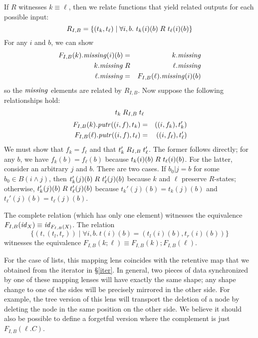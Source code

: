 \begin{defn}[$R$-similarity]
\begin{theorem}
\begin{lemma}
\begin{theorem}[No products]
\begin{lemma}
\begin{defn}
\begin{theorem}
\begin{corollary}[Hylomorphism]
\begin{defn}
\begin{lenseqv}
If $R$ witnesses $k \equiv \ell$, then we relate functions that yield
related outputs for each possible input:
\[R_{I,B} = \{(t_k,t_\ell) \mid \forall i,b.\ t_k(i)(b) \mathrel{R_{}} t_\ell(i)(b)\}\]
For any $i$ and $b$, we can show
\begin{eqnarray*}
F_{I,B}(k).\mathit{missing}(i)(b) &=& k.\mathit{missing} \\
k.\mathit{missing} &\mathrel{R_{}}& \ell.\mathit{missing} \\
\ell.\mathit{missing} &=& F_{I,B}(\ell).\mathit{missing}(i)(b)
\end{eqnarray*}
so the $\mathit{missing}$ elements are related by $R_{I,B}$. Now suppose the
following relationships hold:
\[t_k \mathrel{R_{I,B}} t_\ell\]
\vspace{-4ex} %
\begin{eqnarray*}
    F_{I,B}(k).\mathit{putr}((i,f),t_k) &=& ((i,f_k),t_k') \\
    F_{I,B}(\ell).\mathit{putr}((i,f),t_\ell) &=& ((i,f_\ell),t_\ell')
\end{eqnarray*}
We must show that $f_k = f_\ell$ and that $t_k'\mathrel{R_{I,B}}t_\ell'$.
The former follows directly; for any $b$, we have $f_k(b)=f_\ell(b)$ because
$t_k(i)(b) \mathrel{R_{}} t_\ell(i)(b)$. For the latter, consider an arbitrary $j$
and $b$. There are two cases. If $b_0|j = b$ for some $b_0 \in B(i \wedge
j)$, then $t_k'(j)(b) \mathrel{R_{}} t_\ell'(j)(b)$ because $k$ and $\ell$ preserve
$R$-states; otherwise, $t_k'(j)(b) \mathrel{R_{}} t_\ell'(j)(b)$ because
$t_k'(j)(b)=t_k(j)(b)$ and $t_\ell'(j)(b)=t_\ell(j)(b)$.
\end{lenseqv}

\begin{functoriality}
The complete relation (which has only one element) witnesses the equivalence
$F_{I,B}(\mathit{id}_X)\equiv\mathit{id}_{F_{I,B}(X)}$. The relation
\[\{(t,(t_l,t_r))\mid\forall i,b.\ t(i)(b)=(t_l(i)(b),t_r(i)(b))\}\]
witnesses the equivalence $F_{I,B}(k;\ell) \equiv F_{I,B}(k);F_{I,B}(\ell)$.
\end{functoriality}
\fi

For the case of lists, this mapping lens coincides with the retentive map
that we obtained from the iterator in \S\ref{iter}.
%
In general, two pieces of data synchronized by one of these mapping lenses
will have exactly the same shape; any shape change to one of the sides will
be precisely mirrored in the other side.
%
For example, the tree version of this lens will transport the deletion of a
node by deleting the node in the same position on the other side.
%
We believe it should also be possible to define a forgetful version where the
complement is just $F_{I,B}(\ell.C)$.


\end{defn}
\end{corollary}
\end{theorem}
\end{defn}
\end{lemma}
\end{theorem}
\end{lemma}
\end{theorem}
\end{defn}
